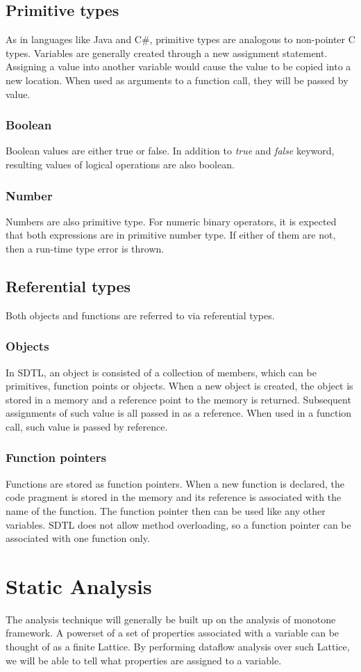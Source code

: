 \documentclass[a4paper,12pt]{article}
\begin{document}
\subsection{Primitive types}
As in languages like Java and C\#, primitive types are analogous to non-pointer C types. Variables are generally created through a new assignment statement. Assigning a value into another variable would cause the value to be copied into a new location. When used as arguments to a function call, they will be passed by value.
\subsubsection{Boolean}
Boolean values are either true or false. In addition to \textit{true} and \textit{false} keyword, resulting values of logical operations are also boolean.
\subsubsection{Number}
Numbers are also primitive type. For numeric binary operators, it is expected that both expressions are in primitive number type. If either of them are not, then a run-time type error is thrown.
\subsection{Referential types}
Both objects and functions are referred to via referential types.
\subsubsection{Objects}
In SDTL, an object is consisted of a collection of members, which can be primitives, function points or objects. When a new object is created, the object is stored in a memory and a reference point to the memory is returned. Subsequent assignments of such value is all passed in as a reference. When used in a function call, such value is passed by reference.
\subsubsection{Function pointers}
Functions are stored as function pointers. When a new function is declared, the code pragment is stored in the memory and its reference is associated with the name of the function. The function pointer then can be used like any other variables. SDTL does not allow method overloading, so a function pointer can be associated with one function only.
\section{Static Analysis}
The analysis technique will generally be built up on the analysis of monotone framework. A powerset of a set of properties associated with a variable can be thought of as a finite Lattice. By performing dataflow analysis over such Lattice, we will be able to tell what properties are assigned to a variable.\\
\end{document}
